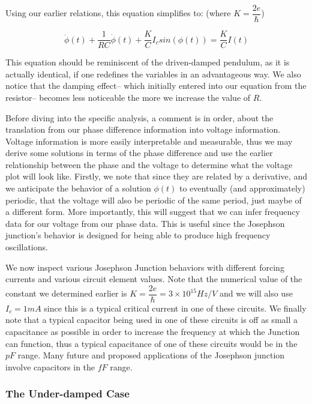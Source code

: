 \documentclass[12pt]{article}
\begin{document}
Using our earlier relations, this equation simplifies to:  (where $K = \dfrac{2e}{\hbar} $)

\begin{equation}
\ddot{\phi}(t) + \dfrac{1}{RC} \dot{\phi}(t) + \dfrac{K}{C} I_c sin(\phi(t)) = \dfrac{K}{C} I(t)
\end{equation}

This equation should be reminiscent of the driven-damped pendulum, as it is actually identical, if one redefines the variables in an advantageous way.  We also notice that the damping effect-- which initially entered into our equation from the resistor-- becomes less noticeable the more we increase the value of $R$.

Before diving into the specific analysis, a comment is in order, about the translation from our phase difference information into voltage information.  Voltage information is more easily interpretable and measurable, thus we may derive some solutions in terms of the phase difference and use the earlier relationship between the phase and the voltage to determine what the voltage plot will look like.  Firstly, we note that since they are related by a derivative, and we anticipate the behavior of a solution $\phi(t)$ to eventually (and approximately) periodic, that the voltage will also be periodic of the same period, just maybe of a different form.  More importantly, this will suggest that we can infer frequency data for our voltage from our phase data.  This is useful since the Josephson junction's behavior is designed for being able to produce high frequency oscillations.

We now inspect various Josephson Junction behaviors with different forcing currents and various circuit element values.  Note that the numerical value of the constant we determined earlier is $K = \dfrac{2e}{\hbar} = 3 \times 10^{15} Hz/V$ and we will also use $I_c = 1 mA$ since this is a typical critical current in one of these circuits.  We finally note that a typical capacitor being used in one of these circuits is off as small a capacitance as possible in order to increase the frequency at which the Junction can function, thus a typical capacitance of one of these circuits would be in the $pF$ range.  Many future and proposed applications of the Josephson junction involve capacitors in the $fF$ range.

\subsubsection{The Under-damped Case}
\end{document}
